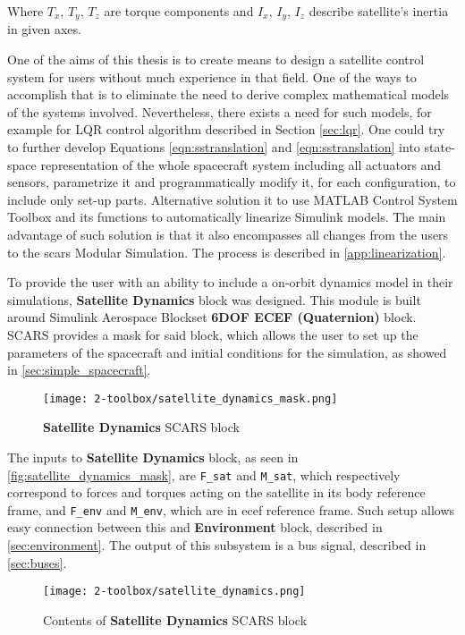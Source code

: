     Where $T_x$, $T_y$, $T_z$ are torque components and $I_x$, $I_y$, $I_z$ describe satellite's inertia in given axes.

    One of the aims of this thesis is to create means to design a satellite control system for users without much experience in that field. One of the ways to accomplish that is to eliminate the need to derive complex mathematical models of the systems involved. Nevertheless, there exists a need for such models, for example for LQR control algorithm described in Section \ref{sec:lqr}. One could try to further develop Equations \ref{eqn:sstranslation} and \ref{eqn:sstranslation} into state-space representation of the whole spacecraft system including all actuators and sensors, parametrize it and programmatically modify it, for each configuration, to include only set-up parts. Alternative solution it to use MATLAB Control System Toolbox and its functions to automatically linearize Simulink models. The main advantage of such solution is that it also encompasses all changes from the users to the \ac{scars} Modular Simulation. The process is described in \autoref{app:linearization}.
    
    To provide the user with an ability to include a on-orbit dynamics model in their simulations, \textbf{Satellite Dynamics} block was designed. This module is built around Simulink Aerospace Blockset \textbf{6DOF ECEF (Quaternion)} block. SCARS provides a mask for said block, which allows the user to set up the parameters of the spacecraft and initial conditions for the simulation, as showed in \autoref{sec:simple_spacecraft}.
    \vfill
    \begin{figure}[H]
        \centering
        \texttt{[image: 2-toolbox/satellite\_dynamics\_mask.png]}
        \caption{\textbf{Satellite Dynamics} SCARS block}
        \label{fig:satellite_dynamics_mask}
    \end{figure}
    \vfill
    The inputs to \textbf{Satellite Dynamics} block, as seen in \autoref{fig:satellite_dynamics_mask}, are \verb|F_sat| and \verb|M_sat|, which respectively correspond to forces and torques acting on the satellite in its body reference frame, and \verb|F_env| and \verb|M_env|, which are in \ac{ecef} reference frame. Such setup allows easy connection between this and \textbf{Environment} block, described in \autoref{sec:environment}. The output of this subsystem is a bus signal, described in \autoref{sec:buses}.

    \begin{sidewaysfigure}
        \centering
        \texttt{[image: 2-toolbox/satellite\_dynamics.png]}
        \caption{Contents of \textbf{Satellite Dynamics} SCARS block}
        \label{fig:satellite_dynamics}
    \end{sidewaysfigure}



